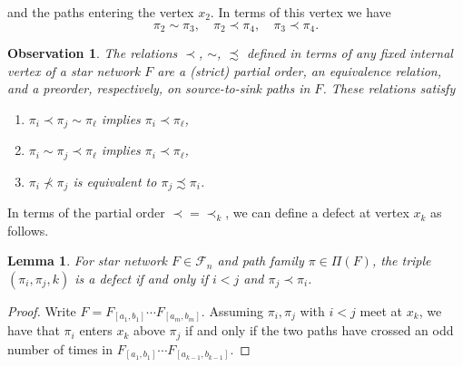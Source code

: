 \documentclass[12pt]{amsart}
\newtheorem{obs}[thm]{Observation}
\newtheorem{lem}[thm]{Lemma}
\theoremstyle{definition}
\numberwithin{equation}{section}
\newcommand{\ctr}[1]{{x}_{#1}}
\newcommand{\ocnet}[1]{\mathcal F_{#1}}%
\begin{document}
and the 
paths entering the vertex $x_2$.
In terms of this vertex we have
\begin{equation*}
\pi_2\sim\pi_3,
\quad  
\pi_2\prec \pi_4,
\quad 
\pi_3\prec \pi_4.
\end{equation*}
\begin{obs}
    The relations $\prec$, $\sim$, $\precsim$ defined in terms of any fixed internal vertex of a star network $F$
    are a (strict) partial order, an equivalence relation, and a preorder, respectively, on source-to-sink paths in $F$.
    These relations satisfy
    \begin{enumerate}
        \item $\pi_i \prec \pi_j \sim \pi_\ell$ implies $\pi_i \prec \pi_\ell$, 
        \item $\pi_i \sim \pi_j \prec \pi_\ell$ implies $\pi_i \prec \pi_\ell$,
        \item $\pi_i \not \prec \pi_j$ is equivalent to $\pi_j \precsim \pi_i$.
    \end{enumerate}
\end{obs}
In terms of the partial order $\prec = \prec_k$, we can define a defect at vertex $x_k$ as follows.
\begin{lem}\label{l: alt defect defn}
    For star network $F \in \ocnet n$ and path family $\pi \in \Pi(F)$, the triple $(\pi_i, \pi_j, k)$ is a defect if and only if $i < j$ and $\pi_j \prec \pi_i$.
\end{lem}
\begin{proof}
    Write $F = F_{[a_1,b_1]} \cdots  F_{[a_m,b_m]}$. Assuming $\pi_i, \pi_j$ with $i < j$ meet at $\ctr k$, we have that $\pi_i$ enters $\ctr k$
    above $\pi_j$ if and only if the two paths have crossed an odd number of times in $F_{[a_1,b_1]} \cdots F_{[a_{k-1},b_{k-1}]}$.
\end{proof}
\end{document}
